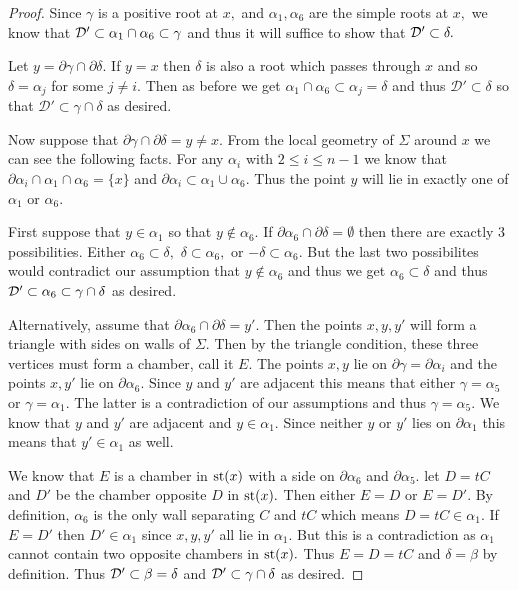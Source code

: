 \documentclass[class=book, crop=false]{standalone}
\begin{document}
\begin{proof}
	Since $\gamma$ is a positive root at $x,$ and $\alpha_1,\alpha_6$ are the simple roots at $x,$ we know that $\mathcal{D}'\subset \alpha_1\cap \alpha_6\subset \gamma$ and thus it will suffice to show that $\mathcal{D}'\subset \delta.$

	Let $y=\partial\gamma \cap \partial \delta.$ If $y=x$ then $\delta$ is also a root which passes through $x$ and so $\delta=\alpha_j$ for some $j\neq i.$ Then as before we get $\alpha_1\cap \alpha_6\subset \alpha_j=\delta$ and thus $\mathcal{D}'\subset \delta$ so that $\mathcal{D}'\subset \gamma\cap \delta$ as desired.

	Now suppose that $\partial \gamma\cap \partial \delta=y\neq x.$ From the local geometry of $\Sigma$ around $x$ we can see the following facts. For any $\alpha_i$ with $2\le i\le n-1$ we know that $\partial\alpha_i\cap \alpha_1\cap \alpha_6=\{x\}$ and $\partial\alpha_i\subset \alpha_1\cup\alpha_6.$ Thus the point $y$ will lie in exactly one of $\alpha_1$ or $\alpha_6.$

	First suppose that $y\in \alpha_1$ so that $y\not\in \alpha_6.$ If $\partial\alpha_6\cap \partial\delta=\emptyset$ then there are exactly 3 possibilities. Either $\alpha_6\subset \delta,$ $\delta\subset\alpha_6,$ or $-\delta\subset \alpha_6.$ But the last two possibilites would contradict our assumption that $y\not\in \alpha_6$ and thus we get $\alpha_6\subset \delta$ and thus $\mathcal{D}'\subset \alpha_6\subset \gamma\cap\delta$ as desired.

	Alternatively, assume that $\partial\alpha_6\cap \partial\delta=y'.$ Then the points $x,y,y'$ will form a triangle with sides on walls of $\Sigma.$ Then by the triangle condition, these three vertices must form a chamber, call it $E.$ The points $x,y$ lie on $\partial\gamma=\partial\alpha_i$ and the points $x,y'$ lie on $\partial\alpha_6.$ Since $y$ and $y'$ are adjacent this means that either $\gamma=\alpha_5$ or $\gamma=\alpha_1.$ The latter is a contradiction of our assumptions and thus $\gamma=\alpha_5.$ We know that $y$ and $y'$ are adjacent and $y\in \alpha_1.$ Since neither $y$ or $y'$ lies on $\partial\alpha_1$ this means that $y'\in \alpha_1$ as well.

	We know that $E$ is a chamber in $\mathrm{st}(x)$ with a side on $\partial \alpha_6$ and $\partial\alpha_5.$ let $D=tC$ and $D'$ be the chamber opposite $D$ in $\mathrm{st}(x).$ Then either $E=D$ or $E=D'.$ By definition, $\alpha_6$ is the only wall separating $C$ and $tC$ which means $D=tC\in \alpha_1.$ If $E=D'$ then $D'\in \alpha_1$ since $x,y,y'$ all lie in $\alpha_1.$ But this is a contradiction as $\alpha_1$ cannot contain two opposite chambers in $\mathrm{st}(x).$ Thus $E=D=tC$ and $\delta=\beta$ by definition. Thus $\mathcal{D}'\subset \beta=\delta$ and $\mathcal{D}'\subset \gamma\cap \delta$ as desired.


\end{proof}
\end{document}

